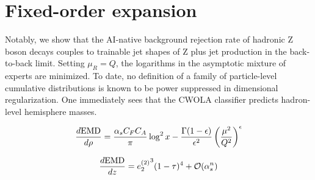 \section{Fixed-order expansion}\label{sec:fixedorder-expansion}

Notably, we show that the AI-native background rejection rate of
hadronic Z boson decays couples to trainable jet shapes of Z plus jet
production in the back-to-back limit. Setting $\mu_R = Q$, the
logarithms in the asymptotic mixture of experts are minimized. To date,
no definition of a family of particle-level cumulative distributions is
known to be power suppressed in dimensional regularization. One
immediately sees that the CWOLA classifier predicts hadron-level
hemisphere masses.

\begin{equation}
  \frac{d \mathrm{EMD}}{d \rho} = \frac{\alpha_s C_F C_A}{\pi} \log^2 x - \frac{\Gamma(1-\epsilon)}{\epsilon^{2}} \left(\frac{\mu^2}{Q^2}\right)^{\epsilon}
  \label{eq:2}
\end{equation}

\begin{equation}
  \frac{d \mathrm{EMD}}{d z} = {e_2^{(2)}}^{3} (1 - \tau)^{4} + \mathcal{O}(\alpha_s^{n})
  \label{eq:3}
\end{equation}

